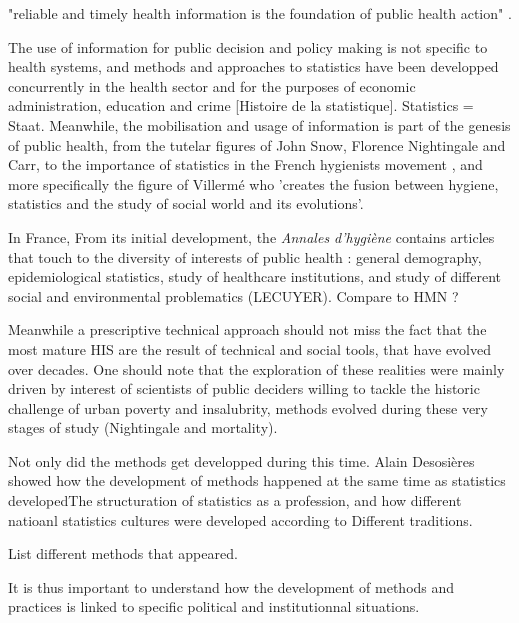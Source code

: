 "reliable and timely health information is the foundation of public health action" \cite{health_metrics_network_framework_2008}.

The use of information for public decision and policy making is not specific to health systems, and methods and approaches to statistics have been developped concurrently in the health sector and for the purposes of economic administration, education and crime [Histoire de la statistique]. Statistics = Staat. Meanwhile, the mobilisation and usage of information is part of the genesis of public health, from the tutelar figures of John Snow, Florence Nightingale and Carr, to the importance of statistics in the French hygienists movement	\cite{porter_trust_1996}, and more specifically the figure of Villermé who 'creates the fusion between hygiene, statistics and the study of social world and its evolutions'.

In France, From its initial development, the \textit{Annales d'hygiène} contains articles that touch to the diversity of interests of public health : general demography, epidemiological statistics, study of healthcare institutions, and study of different social and environmental problematics (LECUYER). Compare to HMN ?

Meanwhile a prescriptive technical approach should not miss the fact that the most mature HIS are the result of technical and social tools, that have evolved over decades. One should note that the exploration of these realities were mainly driven by interest of scientists of public deciders willing to tackle the historic challenge of urban poverty and insalubrity, methods evolved during these very stages of study (Nightingale and mortality).

Not only did the methods get developped during this time. Alain Desosières showed how the development of methods happened at the same time as statistics developedThe structuration of statistics as a profession, and how different natioanl statistics cultures were developed according to  Different traditions.

List different methods that appeared.


It is thus important to understand how the development of methods and practices is linked to specific political and institutionnal situations.


